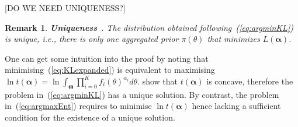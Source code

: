 \documentclass[a4paper, notitlepage, 10pt]{article}
\DeclareMathOperator*{\argmin}{arg\,min}
\newtheorem{remark}{Remark}[]
\begin{document}
[DO WE NEED UNIQUENESS?]  %

\begin{remark}
\label{remark:uniqueness}
\textbf{Uniqueness}~\citep{rufo2012A}.
 The distribution obtained following~(\ref{eq:argminKL}) is unique, i.e., there is only one aggregated prior $\pi(\theta)$ that minimizes $L(\boldsymbol\alpha)$.
\end{remark}
One can get some intuition into the proof by noting that minimising~(\ref{eq:KLexpanded}) is equivalent to maximising $\ln t(\boldsymbol\alpha) = \ln\int_{\boldsymbol\Theta}\prod_{i=0}^{K}f_i(\theta)^{\alpha_i}d\theta$. 
\cite{rufo2012A} show that $t(\boldsymbol\alpha)$ is concave, therefore the problem in~(\ref{eq:argminKL}) has a unique solution.
By contrast, the problem in~(\ref{eq:argmaxEnt}) requires to minimise $\ln t(\boldsymbol\alpha)$ hence lacking a sufficient condition for the existence of a unique solution.

% 
% 
% 
% 
\end{document}
